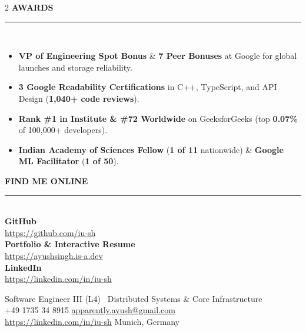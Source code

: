 \documentclass[letterpaper,10pt]{article}
\newcommand{\sidebarSection}[1]{%
  \vspace{8pt}%
  {\fontsize{10.0}{11.5}\selectfont\bfseries\color{white}\MakeUppercase{#1}}\\[-4pt]
  {\color{SidebarRule}\rule{\linewidth}{0.7pt}}\\[4pt]
}
\newcommand{\sItem}[1]{%
  \item {\fontsize{7.9}{9.5}\selectfont\color{SidebarMuted}#1}%
}
\begin{document}
\begin{paracol}{2}
\sidebarSection{AWARDS}
\begin{itemize}[label={\color{white}\tiny$\bullet$}, leftmargin=0.95em, itemsep=1.5pt]
  \sItem{\textbf{\color{white}VP of Engineering Spot Bonus} \& \textbf{\color{white}7 Peer Bonuses} at Google for global launches and storage reliability.}
  \sItem{\textbf{\color{white}3 Google Readability Certifications} in C++, TypeScript, and API Design (\textbf{\color{white}1,040+ code reviews}).}
  \sItem{\textbf{\color{white}Rank \#1 in Institute \& \#72 Worldwide} on GeeksforGeeks (top \textbf{\color{white}0.07\%} of 100,000+ developers).}
  \sItem{\textbf{\color{white}Indian Academy of Sciences Fellow} (\textbf{\color{white}1 of 11} nationwide) \& \textbf{\color{white}Google ML Facilitator} (\textbf{\color{white}1 of 50}).}
\end{itemize}

\sidebarSection{FIND ME ONLINE}
{\fontsize{8.1}{10.2}\selectfont\color{white}
  \faGithub\hspace{5pt}\textbf{GitHub}\\[1pt]
  {\fontsize{7.8}{9.4}\selectfont\color{SidebarMuted}\href{https://github.com/iu-sh}{https://github.com/iu-sh}}\\[5pt]
  \faGlobe\hspace{5pt}\textbf{Portfolio \& Interactive Resume}\\[1pt]
  {\fontsize{7.8}{9.4}\selectfont\color{SidebarMuted}\href{https://ayushsingh.is-a.dev}{https://ayushsingh.is-a.dev}}\\[5pt]
  \faLinkedin\hspace{5pt}\textbf{LinkedIn}\\[1pt]
  {\fontsize{7.8}{9.4}\selectfont\color{SidebarMuted}\href{https://linkedin.com/in/iu-sh}{https://linkedin.com/in/iu-sh}}
}

\switchcolumn

\vspace{2pt}
{\fontsize{11.5}{13.5}\selectfont\color{TealAccent}Software Engineer III (L4) \textperiodcentered\ Distributed Systems \& Core Infrastructure}\\[4pt]
{\fontsize{8.0}{9.8}\selectfont\color{RightBody}
  {\color{RightIcon}\faPhone*}\hspace{3.5pt}+49 1735 34 8915 \hspace{10pt}
  {\color{RightIcon}\faAt}\hspace{3.5pt}\href{mailto:apparently.ayush@gmail.com}{apparently.ayush@gmail.com}\\[2pt]
  {\color{RightIcon}\faLink}\hspace{3.5pt}\href{https://linkedin.com/in/iu-sh}{https://linkedin.com/in/iu-sh} \hspace{10pt}
  {\color{RightIcon}\faMapMarker*}\hspace{3.5pt}Munich, Germany
}
\vspace{2pt}


\end{paracol}
\end{document}
